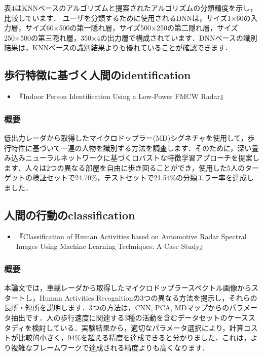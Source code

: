 \documentclass[dvipdfmx]{jsarticle}
\begin{document}
表4はKNNベースのアルゴリズムと提案されたアルゴリズムの分類精度を示し，比較しています．
ユーザを分類するために使用されるDNNは，サイズ1×60の入力層，サイズ60×500の第一隠れ層，サイズ500×250の第二隠れ層，サイズ250×500の第三隠れ層，350×4の出力層で構成されています．DNNベースの識別結果は，KNNベースの識別結果よりも優れていることが確認できます．

\subsection{歩行特徴に基づく人間のidentification}
\begin{itemize}
    \item 『Indoor Person Identification Using a Low-Power FMCW Radar\cite{MD}』
\end{itemize}

\subsubsection{概要}
低出力レーダから取得したマイクロドップラー(MD)シグネチャを使用して，歩行特性に基づいて一連の人物を識別する方法を調査します．そのために，深い畳み込みニューラルネットワークに基づくロバストな特徴学習アプローチを提案します．人々は2つの異なる部屋を自由に歩き回ることができ，使用した5人のターゲットの検証セットで24.70\%，テストセットで21.54\%の分類エラー率を達成しました．

\subsection{人間の行動のclassification}
\begin{itemize}
    \item 『Classification of Human Activities based on Automotive Radar Spectral Images Using Machine Learning Techniques: A Case Study\cite{motion}』
\end{itemize}

\subsubsection{概要}
本論文では，車載レーダから取得したマイクロドップラースペクトル画像からスタートし，Human Activities Recognitionの3つの異なる方法を提示し，それらの長所・短所を説明します．3つの方法は，CNN, PCA, MDマップからのパラメータ抽出です．人の歩行速度に関連する3種の活動を含むデータセットのケーススタディを検討している．実験結果から，適切なパラメータ選択により，計算コストが比較的小さく，94\%を超える精度を達成できると分かりました．これは，より複雑なフレームワークで達成される精度よりも高くなります．
\end{document}
